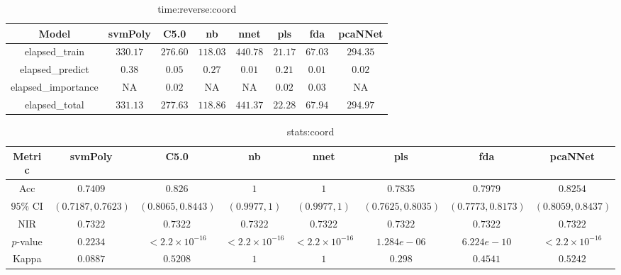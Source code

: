 \begin{table}[!ht]
	\centering
	\begin{tabular}{|c|c|c|c|c|c|c|c|}
		\hline
		Model & svmPoly & C5.0 & nb & nnet & pls & fda & pcaNNet \\ \hline
		elapsed_train & $330.17$ & $276.60$ & $118.03$ & $440.78$ & $21.17$ & $67.03$ & $294.35$ \\ \hline
		elapsed_predict & $0.38$ & $0.05$ & $0.27$ & $0.01$ & $0.21$ & $0.01$ & $0.02$ \\ \hline
		elapsed_importance & NA & $0.02$ & NA & NA & $0.02$ & $0.03$ & NA \\ \hline
		elapsed_total & $331.13$ & $277.63$ & $118.86$ & $441.37$ & $22.28$ & $67.94$ & $294.97$ \\ \hline
	\end{tabular}
	\caption{time:reverse:coord}
	\label{tab:time:reverse:coord}
\end{table}

\begin{table}[!ht]
	\centering
	\begin{tabular}{|c|c|c|c|c|c|c|c|}
		\hline
		Metric & svmPoly & C5.0 & nb & nnet & pls & fda & pcaNNet \\ \hline
		Acc & $0.7409$ & $0.826$ & $1$ & $1$ & $0.7835$ & $0.7979$ & $0.8254$ \\ \hline
		$95\%$ CI & $(0.7187, 0.7623)$ & $(0.8065, 0.8443)$ & $(0.9977, 1)$ & $(0.9977, 1)$ & $(0.7625, 0.8035)$ & $(0.7773, 0.8173)$ & $(0.8059, 0.8437)$ \\ \hline
		NIR & $0.7322$ & $0.7322$ & $0.7322$ & $0.7322$ & $0.7322$ & $0.7322$ & $0.7322$ \\ \hline
		$p$-value & $0.2234$ & $< 2.2 \times {10}^{-16}$ & $< 2.2 \times {10}^{-16}$ & $< 2.2 \times {10}^{-16}$ & $1.284e-06$ & $6.224e-10$ & $< 2.2 \times {10}^{-16}$ \\ \hline
		Kappa & $0.0887$ & $0.5208$ & $1$ & $1$ & $0.298$ & $0.4541$ & $0.5242$ \\ \hline
	\end{tabular}
	\caption{stats:coord}
	\label{tab:stats:coord}
\end{table}

